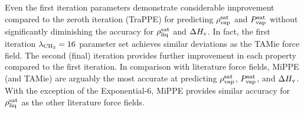 \documentclass[journal=jced,manuscript=article]{achemso}
\begin{document}

Even the first iteration parameters demonstrate considerable improvement compared to the zeroth iteration (TraPPE) for predicting $\rho_{\rm vap}^{\rm sat}$ and $P_{\rm vap}^{\rm sat}$ without significantly diminishing the accuracy for $\rho_{\rm liq}^{\rm sat}$ and $\Delta H_{\rm v}$. In fact, the first iteration $\lambda_{\rm CH_2} = 16$ parameter set achieves similar deviations as the TAMie force field. The second (final) iteration provides further improvement in each property compared to the first iteration. In comparison with literature force fields, MiPPE (and TAMie) are arguably the most accurate at predicting $\rho_{\rm vap}^{\rm sat}$, $P_{\rm vap}^{\rm sat}$, and $\Delta H_{\rm v}$. With the exception of the Exponential-6, \cite{Exp6} MiPPE provides similar accuracy for $\rho_{\rm liq}^{\rm sat}$ as the other literature force fields. 

\end{document}

